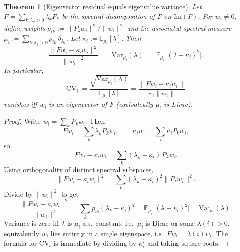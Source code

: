 \documentclass{article}
\theoremstyle{plain}
\newtheorem{theorem}{Theorem}
\numberwithin{equation}{section}
\theoremstyle{definition}
\theoremstyle{remark}
\begin{document}
\begin{lemmaproofbox}
\begin{theorem}[Eigenvector residual equals eigenvalue variance]\label{lem:residual-variance}
Let $F=\sum_{k:\lambda_k>0}\lambda_k P_k$ be the spectral decomposition of $F$ on $\mathrm{Im}(F)$.
For $w_i\neq 0$, define weights $p_{ik}:=\|P_k w_i\|^2/\|w_i\|^2$ and the associated spectral measure
$\mu_i := \sum_{k:\lambda_k>0} p_{ik}\,\delta_{\lambda_k}$.
Let $\kappa_i := \mathbb{E}_{\mu_i}[\lambda]$. Then
\[
\frac{\|F w_i - \kappa_i w_i\|^2}{\|w_i\|^2}
\;=\;
\mathrm{Var}_{\mu_i}(\lambda)
\;=\;
\mathbb{E}_{\mu_i}\big[(\lambda-\kappa_i)^2\big].
\]
In particular,
\[
\mathrm{CV}_i
:=
\frac{\sqrt{\mathrm{Var}_{\mu_i}(\lambda)}}{\mathbb{E}_{\mu_i}[\lambda]}
=
\frac{\|F w_i - \kappa_i w_i\|}{\kappa_i\|w_i\|}
\]
vanishes iff $w_i$ is an eigenvector of $F$ (equivalently $\mu_i$ is Dirac).
\end{theorem}

\begin{proof}
Write $w_i=\sum_k P_k w_i$. Then
\[
F w_i = \sum_k \lambda_k P_k w_i,
\qquad
\kappa_i w_i = \sum_k \kappa_i P_k w_i,
\]
so
\[
F w_i - \kappa_i w_i = \sum_k (\lambda_k-\kappa_i)\,P_k w_i.
\]
Using orthogonality of distinct spectral subspaces,
\[
\|F w_i - \kappa_i w_i\|^2
= \sum_k (\lambda_k-\kappa_i)^2 \|P_k w_i\|^2.
\]
Divide by $\|w_i\|^2$ to get
\[
\frac{\|F w_i - \kappa_i w_i\|^2}{\|w_i\|^2}
= \sum_k p_{ik}(\lambda_k-\kappa_i)^2
= \mathbb{E}_{\mu_i}\big[(\lambda-\kappa_i)^2\big]
= \mathrm{Var}_{\mu_i}(\lambda).
\]
Variance is zero iff $\lambda$ is $\mu_i$-a.s.\ constant, i.e.\ $\mu_i$ is Dirac on some $\lambda(i)>0$,
equivalently $w_i$ lies entirely in a single eigenspace, i.e.\ $F w_i=\lambda(i) w_i$.
The formula for $\mathrm{CV}_i$ is immediate by dividing by $\kappa_i^2$ and taking square-roots.
\end{proof}
\end{lemmaproofbox}
\end{document}
